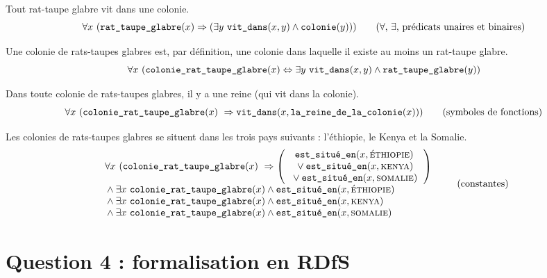 \documentclass[11pt, a4paper]{article}
\def\fm#1{\text{\texttt{#1}}}
\def\lequiv{\Leftrightarrow}
\def\limplique{\Rightarrow}
\def\mlc#1{\text{\begin{tabular}{c}#1\end{tabular}}}
\def\mlg#1{\text{\begin{tabular}{l}#1\end{tabular}}}
\begin{document}
	\bgroup
	\def\colonie{\fm{colonie}}
	\def\colonieRTG{\fm{colonie\_rat\_taupe\_glabre}}
	\def\estSitueEn{\fm{est\_situé\_en}}
	\def\ethiopie{\text{\textsc{éthiopie}}}
	\def\kenya{\text{\textsc{kenya}}}
	\def\laReineDeLaColonie{\fm{la\_reine\_de\_la\_colonie}}
	\def\reine{\fm{reine}}
	\def\RTG{\fm{rat\_taupe\_glabre}}
	\def\somalie{\text{\textsc{somalie}}}
	\def\vitDans{\fm{vit\_dans}}
	
	Tout rat-taupe glabre vit dans une colonie.
	\begin{equation*}
	\forall x ~ (\RTG(x) \limplique (\exists y ~ \vitDans(x, y) \land \colonie(y)))
	\tag{$\forall$, $\exists$, prédicats unaires et binaires}
	\end{equation*}
	
	Une colonie de rats-taupes glabres est, par définition, une colonie dans laquelle
	il existe au moins un rat-taupe glabre.
	\begin{equation*}
	\forall x ~
	(\colonieRTG(x) \lequiv
	\exists y ~ \vitDans(x, y) \land \RTG(y))
	\end{equation*}
	
	Dans toute colonie de rats-taupes glabres, il y a une reine (qui vit dans la colonie).
	\begin{equation*}
	\forall x ~
	(\colonieRTG(x) ~ \limplique \vitDans(x, \laReineDeLaColonie(x)))
	\tag{symboles de fonctions}
	\end{equation*}
	
	Les colonies de rats-taupes glabres se situent dans les trois pays suivants :
	l'éthiopie, le Kenya et la Somalie.
	\begin{equation*}
	\mlg{
		$\forall x ~
		(\colonieRTG(x) ~\limplique
		\left(
		\mlc{$\estSitueEn(x, \ethiopie)$ \\
			$\strut\lor\estSitueEn(x, \kenya)$ \\
			$\strut\lor\estSitueEn(x, \somalie)$}
		\right)$
		\\
		$\strut\land
		\exists x ~ \colonieRTG(x) \land \estSitueEn(x, \ethiopie)$
		\\
		$\strut\land
		\exists x ~ \colonieRTG(x) \land \estSitueEn(x, \kenya)$
		\\
		$\strut\land
		\exists x ~ \colonieRTG(x) \land \estSitueEn(x, \somalie)$
	}
	\tag{constantes}
	\end{equation*}
	\egroup
	
	\section*{Question 4 : formalisation en RDfS}
	
\end{document}
